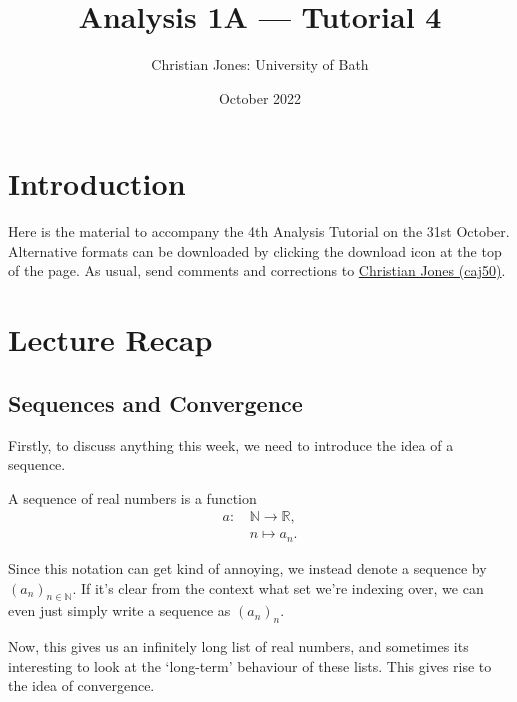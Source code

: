 \documentclass[
  12pt,
  a4paper]{extarticle}
\title{Analysis 1A --- Tutorial 4}
\author{Christian Jones: University of Bath}
\date{October 2022}
\theoremstyle{plain}
\theoremstyle{definition}
\theoremstyle{plain}
\theoremstyle{plain}
\theoremstyle{plain}
\theoremstyle{plain}
\theoremstyle{definition}
\theoremstyle{definition}
\theoremstyle{remark}
\theoremstyle{remark}
\let\BeginKnitrBlock\begin \let\EndKnitrBlock\end
\renewcommand{\;}{\,}
\begin{document}
\maketitle

{
\setcounter{tocdepth}{2}
\tableofcontents
}
\newpage
{}

\hypertarget{introduction}{%
\section*{Introduction}\label{introduction}}

Here is the material to accompany the 4th Analysis Tutorial on the 31st October. Alternative formats can be downloaded by clicking the download icon at the top of the page. As usual, send comments and corrections to \href{mailto:caj50@bath.ac.uk}{Christian Jones (caj50)}.

\hypertarget{lecture-recap}{%
\section{Lecture Recap}\label{lecture-recap}}

\hypertarget{sequences-and-convergence}{%
\subsection{Sequences and Convergence}\label{sequences-and-convergence}}

Firstly, to discuss anything this week, we need to introduce the idea of a sequence.
\BeginKnitrBlock{definition}[Sequence]
{\label{def:def1} }A sequence of real numbers is a function
\begin{align*}
    a:\; &\mathbb{N} \longrightarrow \mathbb{R},\\
    &n \longmapsto a_n.
\end{align*}
\EndKnitrBlock{definition}
Since this notation can get kind of annoying, we instead denote a sequence by \((a_n)_{n\in\mathbb{N}}\). If it's clear from the context what set we're indexing over, we can even just simply write a sequence as \((a_n)_n\).

Now, this gives us an infinitely long list of real numbers, and sometimes its interesting to look at the `long-term' behaviour of these lists. This gives rise to the idea of convergence.
\end{document}
